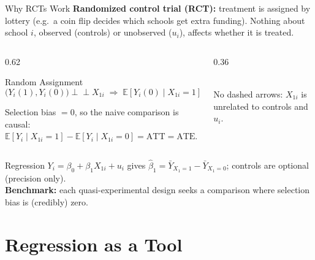 \documentclass[9pt,aspectratio=169]{beamer}
\newcommand{\E}{\mathbb{E}}
\newcommand{\indep}{\perp\!\!\!\perp}
\begin{document}
\begin{frame}{Why RCTs Work}
\linespread{1.2}\selectfont
  \textbf{Randomized control trial (RCT):} treatment is assigned by lottery (e.g.\ a coin flip decides which schools get extra funding). Nothing about school $i$, observed (controls) or unobserved ($u_i$), affects whether it is treated.
  \begin{columns}[c]
  \begin{column}{0.62\textwidth}
  \begin{block}{Random Assignment}
  \[
    \big(Y_i(1),Y_i(0)\big) \indep X_{1i}
    \;\Rightarrow\; \E[Y_i(0)\mid X_{1i}=1]=\E[Y_i(0)\mid X_{1i}=0]
  \]
  \end{block}
  Selection bias $=0$, so the naive comparison is causal:
  $\E[Y_i\mid X_{1i}=1]-\E[Y_i\mid X_{1i}=0] = \text{ATT} = \text{ATE}$.
  \end{column}
  \begin{column}{0.36\textwidth}
  \centering
  \\[0.3em]
  {\footnotesize No dashed arrows: $X_{1i}$ is unrelated to controls and $u_i$.}
  \end{column}
  \end{columns}
  \medskip
  Regression $Y_i = \beta_0 + \beta_1 X_{1i} + u_i$ gives $\hat\beta_1 = \bar Y_{X_1=1} - \bar Y_{X_1=0}$; controls are optional (precision only).\\
  \textbf{Benchmark:} each quasi-experimental design seeks a comparison where selection bias is (credibly) zero.
\end{frame}

\section{Regression as a Tool}
\end{document}
